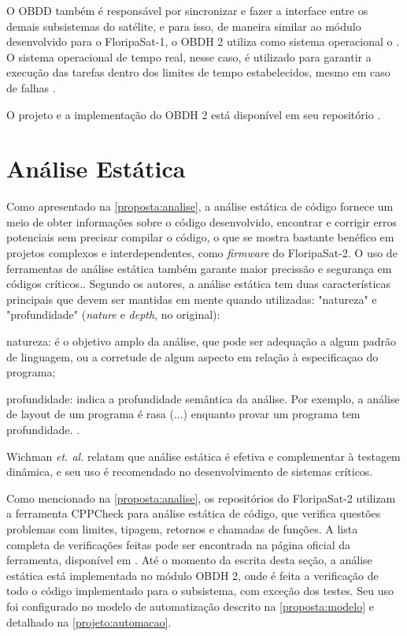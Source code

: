             O OBDD também é responsável por sincronizar e fazer a interface entre os demais subsistemas do satélite, e para isso, de maneira similar ao módulo desenvolvido para o FloripaSat-1, o OBDH 2 utiliza como sistema operacional o \cite{freertos}. O sistema operacional de tempo real, nesse caso, é utilizado para garantir a execução das tarefas dentro dos limites de tempo estabelecidos, mesmo em caso de falhas \cite{marcelino2020-1}.
            
            O projeto e a implementação do OBDH 2 está disponível em seu repositório \cite{obdh2-github}.
    

    \section{Análise Estática}
    \label{projeto:analise}
        Como apresentado na \autoref{proposta:analise}, a análise estática de código fornece um meio de obter informações sobre o código desenvolvido, encontrar e corrigir erros potenciais sem precisar compilar o código, o que se mostra bastante benéfico em projetos complexos e interdependentes, como \textit{firmware} do FloripaSat-2. O uso de ferramentas de análise estática também garante maior precissão e segurança em códigos críticos.\cite{wichman-1995}. Segundo os autores, a análise estática tem duas características principais que devem ser mantidas em mente quando utilizadas: "natureza" e "profundidade" (\textit{nature} e \textit{depth}, no original):
        
        \begin{citacao}
        \hspace{1,2cm}
        natureza: é o objetivo amplo da análise, que pode ser adequação a algum padrão de linguagem, ou a corretude de algum aspecto em relação à especificaçao do programa;
        
        profundidade: indica a profundidade semântica da análise. Por exemplo, a análise de layout de um programa é rasa (...) enquanto provar um programa tem profundidade. \cite{wichman-1995}.
        \end{citacao}
        
        Wichman \textit{et. al.} relatam que análise estática é efetiva e complementar à testagem dinâmica, e seu uso é recomendado no desenvolvimento de sistemas críticos.
        
        Como mencionado na \autoref{proposta:analise}, os repositórios do FloripaSat-2 utilizam a ferramenta CPPCheck para análise estática de código, que verifica questões problemas com limites, tipagem, retornos e chamadas de funções. A lista completa de verificações feitas pode ser encontrada na página oficial da ferramenta, disponível em \cite{cppcheck}. Até o momento da escrita desta seção, a análise estática está implementada no módulo OBDH 2, onde é feita a verificação de todo o código implementado para o subsistema, com exceção dos testes. Seu uso foi configurado no modelo de automatização descrito na \autoref{proposta:modelo} e detalhado na \autoref{projeto:automacao}.
        
